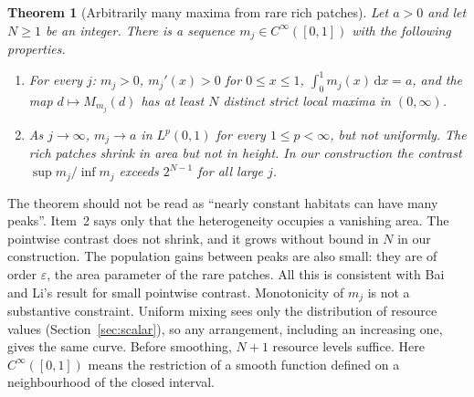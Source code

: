 \documentclass[11pt]{article}
\newtheorem{theorem}{Theorem}
\theoremstyle{remark}
\newcommand{\dd}{\,\mathrm d}
\begin{document}
\begin{theorem}[Arbitrarily many maxima from rare rich patches]\label{thm:main}
Let \(a>0\) and let \(N\geq1\) be an integer. There is a sequence
\(m_j\in C^\infty([0,1])\) with the following properties.
\begin{enumerate}
 \item For every \(j\): \(m_j>0\), \(m_j'(x)>0\) for \(0\leq x\leq1\),
       \(\int_0^1m_j(x)\dd x=a\), and the map \(d\mapsto M_{m_j}(d)\) has at
       least \(N\) distinct strict local maxima in \((0,\infty)\).
 \item As \(j\to\infty\), \(m_j\to a\) in \(L^p(0,1)\) for every
       \(1\leq p<\infty\), but not uniformly. The rich patches shrink in
       area but not in height. In our construction the contrast
       \(\sup m_j/\inf m_j\) exceeds \(2^{N-1}\) for all large \(j\).
\end{enumerate}
\end{theorem}

The theorem should not be read as ``nearly constant habitats can have many
peaks''. Item~2 says only that the heterogeneity occupies a vanishing
area. The pointwise contrast does not shrink, and it grows without bound
in \(N\) in our construction. The population gains between peaks are also
small: they are of order \(\varepsilon\), the area parameter of the rare
patches. All this is consistent with Bai and Li's result for small
pointwise contrast. Monotonicity of \(m_j\) is not a substantive
constraint. Uniform mixing sees only the distribution of resource values
(Section~\ref{sec:scalar}), so any arrangement, including an increasing
one, gives the same curve. Before smoothing, \(N+1\) resource levels
suffice. Here \(C^\infty([0,1])\) means the restriction of a smooth
function defined on a neighbourhood of the closed interval.
\end{document}
